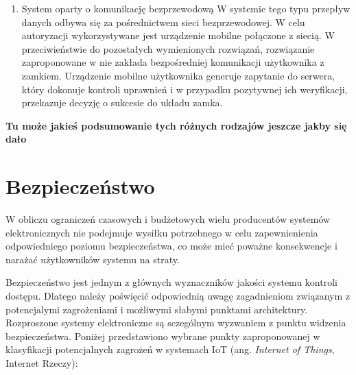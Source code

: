 \begin{enumerate}[label=\Alph*.]
			\item System oparty o komunikację bezprzewodową
				W systemie tego typu przepływ danych odbywa się za pośrednictwem sieci bezprzewodowej. W celu autoryzacji wykorzystywane jest urządzenie mobilne połączone z siecią. W przeciwieństwie do pozostałych wymienionych rozwiązań, rozwiązanie zaproponowane w \cite{cryptographic-iot-access-system} nie zakłada bezpośredniej komunikacji użytkownika z zamkiem. Urządzenie mobilne użytkownika generuje zapytanie do serwera, który dokonuje kontroli uprawnień i w przypadku pozytywnej ich weryfikacji, przekazuje decyzję o sukcesie do układu zamka.

		\end{enumerate}

		\textbf{Tu może jakieś podsumowanie tych różnych rodzajów jeszcze jakby się dało}

	\section{Bezpieczeństwo}

		W obliczu ograniczeń czasowych i budżetowych wielu producentów systemów elektronicznych nie podejmuje wysiłku potrzebnego w celu zapewnienienia odpowiedniego poziomu bezpieczeństwa, co może mieć poważne konsekwencje i narażać użytkowników systemu na straty.

		Bezpieczeństwo jest jednym z głównych wyznaczników jakości systemu kontroli dostępu. Dlatego należy poświęcić odpowiednią uwagę zagadnieniom związanym z potencjalymi zagrożeniami i możliwymi słabymi punktami architektury. Rozproszone systemy elektroniczne są sczególnym wyzwaniem z punktu widzenia bezpieczeństwa. Poniżej przedstawiono wybrane punkty zaproponowanej w \cite{iot-vulnerabilities} klasyfikacji potencjalnych zagrożeń w systemach IoT (ang. \textit{Internet of Things}, Internet Rzeczy):
		
